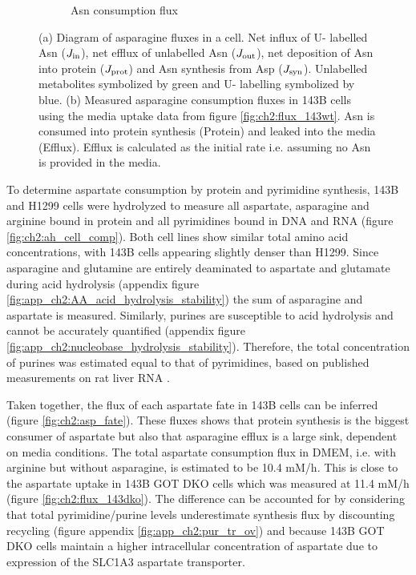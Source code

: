 \begin{figure}[ht]
\begin{subfigure}[b]{0.4\textwidth}
         \caption{Asn consumption flux}
         \label{fig:ch2:Asn_flux}
     \end{subfigure}
     \hspace{0.1\textwidth}
        \caption[Asparagine consumption fluxes.]{
        (a) Diagram of asparagine fluxes in a cell.
        Net influx of U-\hCi{} labelled Asn ($J_{\text{in}}$), net efflux of unlabelled Asn ($J_{\text{out}}$), net deposition of Asn into protein ($J_{\text{prot}}$) and Asn synthesis from Asp ($J_{\text{syn}}$).
        Unlabelled metabolites symbolized by green and U-\hCi{} labelling symbolized by blue.
        (b) Measured asparagine consumption fluxes in 143B cells using the media uptake data from figure \ref{fig:ch2:flux_143wt}.
        Asn is consumed into protein synthesis (Protein) and leaked into the media (Efflux).
        Efflux is calculated as the initial rate i.e. assuming no Asn is provided in the media.
        }
\end{figure}




To determine aspartate consumption by protein and pyrimidine synthesis, 143B and H1299 cells were hydrolyzed to measure all aspartate, asparagine and arginine bound in protein and all pyrimidines bound in DNA and RNA (figure \ref{fig:ch2:ah_cell_comp}).
Both cell lines show similar total amino acid concentrations, with 143B cells appearing slightly denser than H1299.
Since asparagine and glutamine are entirely deaminated to aspartate and glutamate during acid hydrolysis (appendix figure \ref{fig:app_ch2:AA_acid_hydrolysis_stability}) the sum of asparagine and aspartate is measured.
Similarly, purines are susceptible to acid hydrolysis and cannot be accurately quantified (appendix figure \ref{fig:app_ch2:nucleobase_hydrolysis_stability}).
Therefore, the total concentration of purines was estimated equal to that of pyrimidines, based on published measurements on rat liver RNA \cite{Lipshitz1960-jw}.

Taken together, the flux of each aspartate fate in 143B cells can be inferred (figure \ref{fig:ch2:asp_fate}).
These fluxes shows that protein synthesis is the biggest consumer of aspartate but also that asparagine efflux is a large sink, dependent on media conditions.
The total aspartate consumption flux in DMEM, i.e. with arginine but without asparagine, is estimated to be 10.4 mM/h.
This is close to the aspartate uptake in 143B GOT DKO cells which was measured at 11.4 mM/h (figure \ref{fig:ch2:flux_143dko}).
The difference can be accounted for by considering that total pyrimidine/purine levels underestimate synthesis flux by discounting recycling (figure appendix \ref{fig:app_ch2:pur_tr_ov}) and because 143B GOT DKO cells maintain a higher intracellular concentration of aspartate due to expression of the SLC1A3 aspartate transporter.

